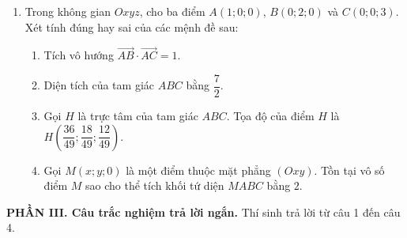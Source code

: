 \documentclass[12pt]{article}
\begin{document}
\begin{enumerate}[label=\textbf{Câu \arabic*.}, leftmargin=*]
		\vspace{4mm}
		\item Trong không gian $Oxyz$, cho ba điểm $A(1; 0; 0)$, $B(0; 2; 0)$ và $C(0; 0; 3)$. Xét tính đúng hay sai của các mệnh đề sau:
		\begin{enumerate}[label=\alph*)]
			\item Tích vô hướng $\overrightarrow{AB} \cdot \overrightarrow{AC} = 1$.
			\item Diện tích của tam giác $ABC$ bằng $\dfrac{7}{2}$.
			\item Gọi $H$ là trực tâm của tam giác $ABC$. Tọa độ của điểm $H$ là $H\left( \dfrac{36}{49}; \dfrac{18}{49}; \dfrac{12}{49} \right)$.
			\item Gọi $M(x; y; 0)$ là một điểm thuộc mặt phẳng $(Oxy)$. Tồn tại vô số điểm $M$ sao cho thể tích khối tứ diện $MABC$ bằng $2$.
		\end{enumerate}
		
	\end{enumerate}
	
	\vspace{4mm}
	\noindent\textbf{PHẦN III. Câu trắc nghiệm trả lời ngắn.} Thí sinh trả lời từ câu 1 đến câu 4.
	\vspace{2mm}
	
\end{document}
